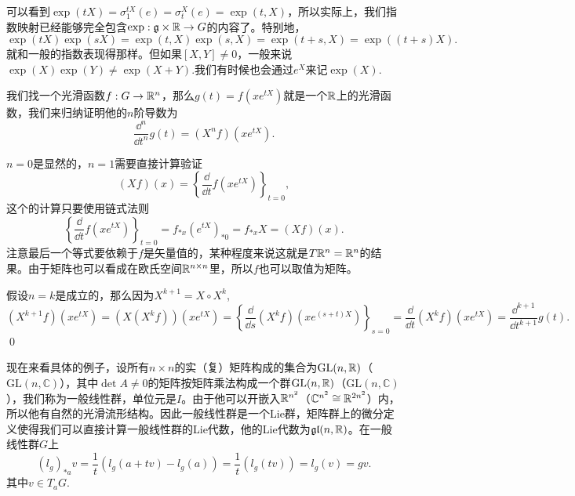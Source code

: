 \documentclass[9pt]{extarticle}
\newcommand{\cc}{\mathbb{C}}
\newcommand{\lag}{{\mathfrak{g}}}
\begin{document}
可以看到$\exp(tX)=\sigma^{tX}_1(e)=\sigma^{X}_t(e)=\exp(t,X)$，所以实际上，我们指数映射已经能够完全包含$\exp:\lag\times \rr\to G$的内容了。特别地，
\[
	\exp(tX)\exp(sX)=\exp(t,X)\exp(s,X)=\exp(t+s,X)=\exp((t+s)X).
\]
就和一般的指数表现得那样。但如果$[X,Y]\neq 0$，一般来说$\exp(X)\exp(Y)\neq \exp(X+Y)$.我们有时候也会通过$e^{X}$来记$\exp(X)$.

\lem \label{exp}我们找一个光滑函数$f:G\to \mathbb{R}^n$，那么$g(t)=f(xe^{tX})$就是一个$\mathbb{R}$上的光滑函数，我们来归纳证明他的$n$阶导数为
\[
	\frac{\dd^n}{\dd t^n}g(t)=(X^nf)(x e^{tX}).
\]

\proof $n=0$是显然的，$n=1$需要直接计算验证
\[
	(Xf)(x)=\left\{\frac{\dd}{\dd t}f(x e^{tX})\right\}_{t=0},
\]
这个的计算只要使用链式法则
\[
	\left\{\frac{\dd}{\dd t}f(x e^{tX})\right\}_{t=0}=f_{*x}(e^{tX})_{*0}=f_{*x}X=(Xf)(x).
\]
注意最后一个等式要依赖于$f$是矢量值的，某种程度来说这就是$T\mathbb{R}^n=\mathbb{R}^n$的结果。由于矩阵也可以看成在欧氏空间$\mathbb{R}^{n\times n}$里，所以$f$也可以取值为矩阵。

假设$n=k$是成立的，那么因为$X^{k+1}=X\circ X^k$,
\[
	(X^{k+1}f)(x e^{tX})=(X(X^{k}f))(x e^{tX})=\left\{\frac{\dd}{\dd s}(X^kf)(x e^{(s+t)X})\right\}_{s=0}=\frac{\dd}{\dd t}(X^kf)(x e^{tX})=\frac{\dd^{k+1}}{\dd t^{k+1}}g(t).
\]\qed



\para 现在来看具体的例子，设所有$n\times n$的实（复）矩阵构成的集合为$\mathrm{GL}(n,\mathbb{R})$（$\mathrm{GL}(n,\cc)$），其中$\det A\neq 0$的矩阵按矩阵乘法构成一个群$\mathrm{GL}(n,\mathbb{R})$（$\mathrm{GL}(n,\cc)$），我们称为一般线性群，单位元是$I$。由于他可以开嵌入$\mathbb{R}^{n^2}$（$\cc^{n^2}\cong \rr^{2n^2}$）内，所以他有自然的光滑流形结构。因此一般线性群是一个Lie群，矩阵群上的微分定义使得我们可以直接计算一般线性群的Lie代数，他的Lie代数为$\mathfrak{gl}(n,\mathbb{R})$。在一般线性群$G$上
\[
	(l_g)_{*a}v=\frac{1}{t}(l_g(a+tv)-l_g(a))
	=\frac{1}{t}(l_g(tv))=l_g(v)=gv.
\]
其中$v\in T_aG$.
\end{document}
